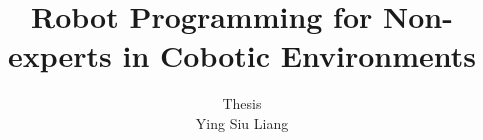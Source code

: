 
\title{Robot Programming for Non-experts in Cobotic Environments}
\author{Thesis\\Ying Siu Liang}

%
